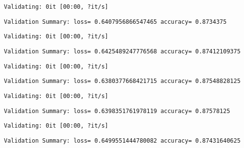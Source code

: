 \documentclass[11pt]{article}
\begin{document}
    
    \begin{Verbatim}[commandchars=\\\{\}]
Validating: 0it [00:00, ?it/s]
    \end{Verbatim}

    
    \begin{Verbatim}[commandchars=\\\{\}]
Validation Summary: loss= 0.6407956866547465 accuracy= 0.8734375
    \end{Verbatim}

    
    \begin{Verbatim}[commandchars=\\\{\}]
Validating: 0it [00:00, ?it/s]
    \end{Verbatim}

    
    \begin{Verbatim}[commandchars=\\\{\}]
Validation Summary: loss= 0.6425489247776568 accuracy= 0.87412109375
    \end{Verbatim}

    
    \begin{Verbatim}[commandchars=\\\{\}]
Validating: 0it [00:00, ?it/s]
    \end{Verbatim}

    
    \begin{Verbatim}[commandchars=\\\{\}]
Validation Summary: loss= 0.6380377668421715 accuracy= 0.87548828125
    \end{Verbatim}

    
    \begin{Verbatim}[commandchars=\\\{\}]
Validating: 0it [00:00, ?it/s]
    \end{Verbatim}

    
    \begin{Verbatim}[commandchars=\\\{\}]
Validation Summary: loss= 0.6398351761978119 accuracy= 0.87578125
    \end{Verbatim}

    
    \begin{Verbatim}[commandchars=\\\{\}]
Validating: 0it [00:00, ?it/s]
    \end{Verbatim}

    
    \begin{Verbatim}[commandchars=\\\{\}]
Validation Summary: loss= 0.6499551444780082 accuracy= 0.87431640625
    \end{Verbatim}
\end{document}
